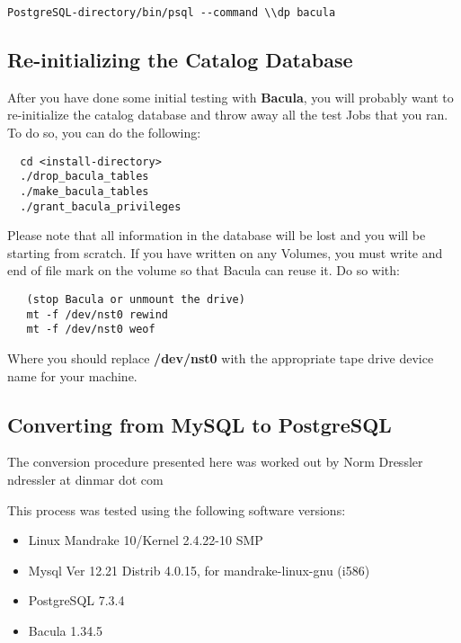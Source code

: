 {{{{\footnotesize
\begin{verbatim}
PostgreSQL-directory/bin/psql --command \\dp bacula
\end{verbatim}
\normalsize

\subsection*{Re-initializing the Catalog Database}

After you have done some initial testing with {\bf Bacula}, you will probably
want to re-initialize the catalog database and throw away all the test Jobs
that you ran. To do so, you can do the following: 

\footnotesize
\begin{verbatim}
  cd <install-directory>
  ./drop_bacula_tables
  ./make_bacula_tables
  ./grant_bacula_privileges
\end{verbatim}
\normalsize

Please note that all information in the database will be lost and you will be
starting from scratch. If you have written on any Volumes, you must write and
end of file mark on the volume so that Bacula can reuse it. Do so with: 

\footnotesize
\begin{verbatim}
   (stop Bacula or unmount the drive)
   mt -f /dev/nst0 rewind
   mt -f /dev/nst0 weof
\end{verbatim}
\normalsize

Where you should replace {\bf /dev/nst0} with the appropriate tape drive
device name for your machine. 

\subsection*{Converting from MySQL to PostgreSQL}

The conversion procedure presented here was worked out by Norm Dressler
\lt{}ndressler at dinmar dot com\gt{} 

This process was tested using the following software versions: 

\begin{itemize}
\item Linux Mandrake 10/Kernel 2.4.22-10 SMP 
\item Mysql Ver 12.21 Distrib 4.0.15, for mandrake-linux-gnu (i586) 
\item PostgreSQL 7.3.4 
\item Bacula 1.34.5 
   \end{itemize}

}}}}
